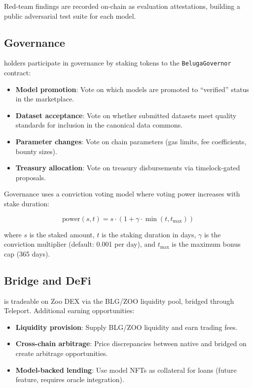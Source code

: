 Red-team findings are recorded on-chain as evaluation attestations, building a public adversarial test suite for each model.

\subsection{Governance}

\BLG{} holders participate in governance by staking tokens to the \texttt{BelugaGovernor} contract:

\begin{itemize}[nosep]
    \item \textbf{Model promotion}: Vote on which models are promoted to ``verified'' status in the marketplace.
    \item \textbf{Dataset acceptance}: Vote on whether submitted datasets meet quality standards for inclusion in the canonical data commons.
    \item \textbf{Parameter changes}: Vote on chain parameters (gas limits, fee coefficients, bounty sizes).
    \item \textbf{Treasury allocation}: Vote on treasury disbursements via timelock-gated proposals.
\end{itemize}

Governance uses a conviction voting model where voting power increases with stake duration:

\begin{equation}
\text{power}(s, t) = s \cdot (1 + \gamma \cdot \min(t, t_{\max}))
\end{equation}

where $s$ is the staked amount, $t$ is the staking duration in days, $\gamma$ is the conviction multiplier (default: 0.001 per day), and $t_{\max}$ is the maximum bonus cap (365 days).

\subsection{Bridge and DeFi}

\BLG{} is tradeable on Zoo DEX via the BLG/ZOO liquidity pool, bridged through Teleport. Additional earning opportunities:

\begin{itemize}[nosep]
    \item \textbf{Liquidity provision}: Supply BLG/ZOO liquidity and earn trading fees.
    \item \textbf{Cross-chain arbitrage}: Price discrepancies between \Beluga{} native and bridged \BLG{} on \Zoo{} create arbitrage opportunities.
    \item \textbf{Model-backed lending}: Use model NFTs as collateral for \BLG{} loans (future feature, requires oracle integration).
\end{itemize}

